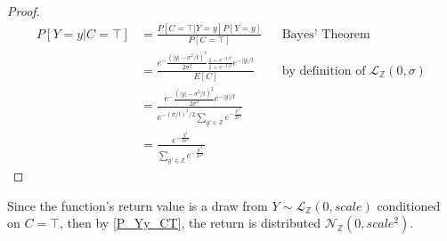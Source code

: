 \documentclass{article}
\begin{document}
\begin{proof}

\begin{align*}
    P[Y=y | C=\top] &= \frac{P[C=\top|Y=y]P[Y=y]}{P[C=\top]} && \text{Bayes' Theorem} \\
    &= \frac{e^-\frac{(|y| - \sigma^2/t)^2}{2\sigma^2} \frac{1 - e^{-1/t}}{1 + e^{-1/t}} e^{-|y|/t}}{E[C]} && \text{by definition of } \mathcal{L}_\mathbb{Z}(0, \sigma) \\
    &= \frac{e^-\frac{(|y| - \sigma^2/t)^2}{2\sigma^2} e^{-|y|/t}}{e^{-(\sigma/t)^2/2} \sum_{y' \in \mathbb{Z}} e^{-\frac{y'^2}{2\sigma^2}}} \\
    &= \frac{e^{-\frac{y^2}{2\sigma^2}}}{\sum_{y' \in \mathbb{Z}} e^{-\frac{y'^2}{2\sigma^2}}}
\end{align*}
\end{proof}

Since the function's return value is a draw from $Y \sim \mathcal{L}_\mathbb{Z}(0, scale)$ conditioned on $C = \top$, then by \ref{P_Yy_CT}, the return is distributed $\mathcal{N}_\mathbb{Z}(0, scale^2)$.



\end{document}
